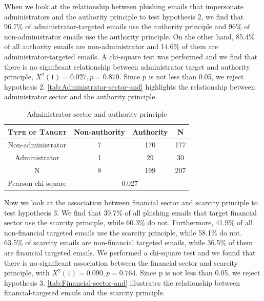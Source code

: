When we look at the relationship between phishing emails that impersonate
administrators and the authority principle to test hypothesis 2, we
find that 96.7\% of administrator-targeted emails use the authority
principle and 96\% of non-administrator emails use the authority principle.
On the other hand, 85.4\% of all authority emails are non-administrator
and 14.6\% of them are administrator-targeted emails. A chi-square
test was performed and we find that there is no significant relationship
between administrator target and authority principle, $X^{2}(1)=0.027,p=0.870$.
Since p is not less than 0.05, we reject hypothesis 2. \autoref{tab:Administrator-sector-and}
highlights the relationship between administrator sector and the authority
principle.

\begin{minipage}[t]{1\columnwidth}%
\begin{longtable}{cccc}
\caption{\label{tab:Administrator-sector-and}Administrator sector and authority
principle }
\tabularnewline
\toprule 
\textsc{\footnotesize{}Type of Target} & {\footnotesize{}Non-authority} & {\footnotesize{}Authority} & \multirow{1}{*}{{\footnotesize{}N}}\tabularnewline
\midrule 
\multirow{1}{*}{{\footnotesize{}Non-administrator}} & {\footnotesize{}7} & {\footnotesize{}170} & \multirow{1}{*}{{\footnotesize{}177}}\tabularnewline
\midrule 
\multirow{1}{*}{{\footnotesize{}Administrator}} & {\footnotesize{}1} & {\footnotesize{}29} & \multirow{1}{*}{{\footnotesize{}30}}\tabularnewline
\midrule
\midrule 
{\footnotesize{}N} & {\footnotesize{}8} & {\footnotesize{}199} & {\footnotesize{}207}\tabularnewline
\midrule
\midrule 
{\footnotesize{}Pearson chi-square} & \multicolumn{3}{c}{{\footnotesize{}0.027}}\tabularnewline
\midrule
\end{longtable}%
\end{minipage}

Now we look at the association between financial sector and scarcity
principle to test hypothesis 3. We find that 39.7\% of all phishing
emails that target financial sector use the scarcity principle, while
60.3\% do not. Furthermore, 41.9\% of all non-financial targeted emails
use the scarcity principle, while 58.1\% do not. 63.5\% of scarcity
emails are non-financial targeted emails, while 36.5\% of them are
financial targeted emails. We performed a chi-square test and we found
that there is no significant association between the financial sector
and scarcity principle, with $X^{2}(1)=0.090,p=0.764$. Since p is
not less than 0.05, we reject hypothesis 3. \autoref{tab:Financial-sector-and}
illustrates the relationship between financial-targeted emails and
the scarcity principle.

